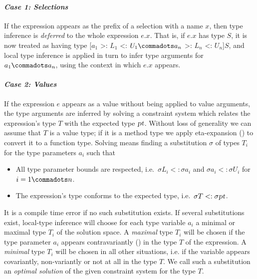\paragraph{\em Case 1: Selections}
If the expression appears as the prefix of a selection with a name
$x$, then type inference is {\em deferred} to the whole expression
$e.x$. That is, if $e.x$ has type $S$, it is now treated as having
type [$a_1$ >: $L_1$ <: $U_1 \commadots a_n$ >: $L_n$ <: $U_n$]$S$,
and local type inference is applied in turn to infer type arguments 
for $a_1 \commadots a_n$, using the context in which $e.x$ appears.

\paragraph{\em Case 2: Values}
If the expression $e$ appears as a value without being applied to
value arguments, the type arguments are inferred by solving a
constraint system which relates the expression's type $T$ with the
expected type $\mbox{\sl pt}$. Without loss of generality we can assume that
$T$ is a value type; if it is a method type we apply eta-expansion
() to convert it to a function type.  Solving
means finding a substitution $\sigma$ of types $T_i$ for the type
parameters $a_i$ such that
\begin{itemize}
\item 
All type parameter bounds are respected, i.e.\ 
$\sigma L_i <: \sigma a_i$ and $\sigma a_i <: \sigma U_i$ for $i = 1 \commadots n$.
\item 
The expression's type conforms to the expected type, i.e.\ 
$\sigma T <: \sigma \mbox{\sl pt}$.
\end{itemize}
It is a compile time error if no such substitution exists.  
If several substitutions exist, local-type inference will choose for
each type variable $a_i$ a minimal or maximal type $T_i$ of the
solution space.  A {\em maximal} type $T_i$ will be chosen if the type
parameter $a_i$ appears contravariantly (\sref{sec:variances}) in the
type $T$ of the expression.  A {\em minimal} type $T_i$ will be chosen
in all other situations, i.e. if the variable appears covariantly,
non-variantly or not at all in the type $T$. We call such a substitution
an {\em optimal solution} of the given constraint system for the type $T$.

